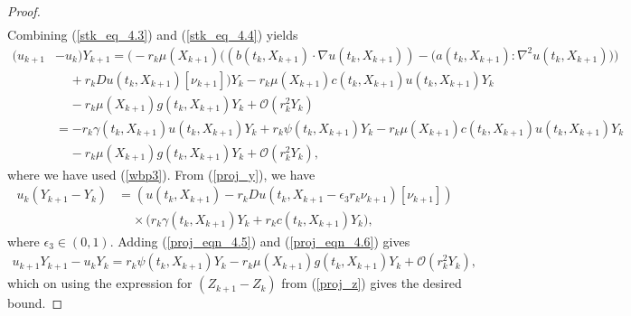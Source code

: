 \documentclass{article}
\theoremstyle{definition}
\numberwithin{equation}{section}
\begin{document}
\begin{proof}
\begin{align}
\end{align}
Combining (\ref{stk_eq_4.3}) and (\ref{stk_eq_4.4}) yields
\begin{align}
(u_{k+1}&-u_{k})Y_{k+1} = \bigg(-r_{k}\mu(X_{k+1})\Big((b(t_{k}, X_{k+1}) \cdot \nabla u(t_{k}, X_{k+1})) - \big(a(t_{k}, X_{k+1}) : \nabla^2 u(t_{k}, X_{k+1})\big) \Big) \nonumber \\ &  \;\;\; \;+  r_{k}Du(t_{k}, X_{k+1})[\nu_{k+1}]\bigg)Y_{k} - r_{k}\mu(X_{k+1})c(t_{k}, X_{k+1})u(t_{k}, X_{k+1})Y_{k} \nonumber  \\&  \;\;\; \; - r_{k}\mu(X_{k+1})g(t_{k}, X_{k+1})Y_{k} + \mathcal{O}(r_{k}^{2}Y_{k})
\nonumber\\ &  = -r_{k}\gamma(t_{k}, X_{k+1})u(t_{k}, X_{k+1})Y_{k} + r_{k}\psi(t_{k}, X_{k+1})Y_{k}- r_{k}\mu(X_{k+1})c(t_{k}, X_{k+1})u(t_{k}, X_{k+1})Y_{k} \nonumber \\ &  \;\;\; \; - r_{k}\mu(X_{k+1})g(t_{k}, X_{k+1})Y_{k} + \mathcal{O}(r_{k}^{2}Y_{k}), \label{proj_eqn_4.5}
\end{align}
where we have used (\ref{wbp3}). From (\ref{proj_y}), we have
\begin{align}
u_{k}(Y_{k+1} - Y_{k}) &= (u(t_{k},X_{k+1}) - r_{k}Du(t_{k}, X_{k+1} - \epsilon_{3}r_{k}\nu_{k+1})[\nu_{k+1}]) \nonumber  \\ & \;\;\;\; \times \big(r_{k}\gamma(t_{k}, X_{k+1})Y_{k} + r_{k}c(t_{k}, X_{k+1})Y_{k}\big), \label{proj_eqn_4.6}
\end{align}
where $\epsilon_3 \in (0,1)$. Adding (\ref{proj_eqn_4.5}) and (\ref{proj_eqn_4.6}) gives
\begin{align}
u_{k+1} Y_{k+1} -  u_{k}Y_{k} = r_{k}\psi(t_{k},X_{k+1})Y_{k} - r_{k}\mu(X_{k+1})g(t_{k},X_{k+1})Y_{k} +\mathcal{O}(r_{k}^2 Y_k), 
\end{align}
 which on using the expression for $(Z_{k+1} - Z_{k})$ from (\ref{proj_z}) gives the desired bound.
\end{proof}
\end{document}
